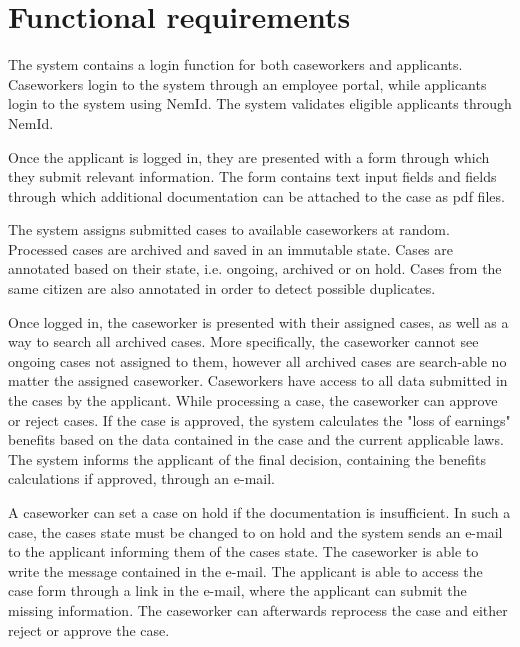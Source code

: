 \newpage
\section{Functional requirements}

The system contains a login function for both caseworkers and applicants. Caseworkers login to the system through an employee portal, while applicants login to the system using NemId. The system validates eligible applicants through NemId.

\vspace{2mm}

Once the applicant is logged in, they are presented with a form through which they submit relevant information. The form contains text input fields and fields through which additional documentation can be attached to the case as pdf files.

\vspace{2mm}

The system assigns submitted cases to available caseworkers at random. Processed cases are archived and saved in an immutable state. Cases are annotated based on their state, i.e. ongoing, archived or on hold. Cases from the same citizen are also annotated in order to detect possible duplicates.

\vspace{2mm}

Once logged in, the caseworker is presented with their assigned cases, as well as a way to search all archived cases. More specifically, the caseworker cannot see ongoing cases not assigned to them, however all archived cases are search-able no matter the assigned caseworker. Caseworkers have access to all data submitted in the cases by the applicant. While processing a case, the caseworker can approve or reject cases. If the case is approved, the system calculates the "loss of earnings" benefits based on the data contained in the case and the current applicable laws. The system informs the applicant of the final decision, containing the benefits calculations if approved, through an e-mail.

\vspace{2mm}

A caseworker can set a case on hold if the documentation is insufficient. In such a case, the cases state must be changed to on hold and the system sends an e-mail to the applicant informing them of the cases state. The caseworker is able to write the message contained in the e-mail. The applicant is able to access the case form through a link in the e-mail, where the applicant can submit the missing information. The caseworker can afterwards reprocess the case and either reject or approve the case.

